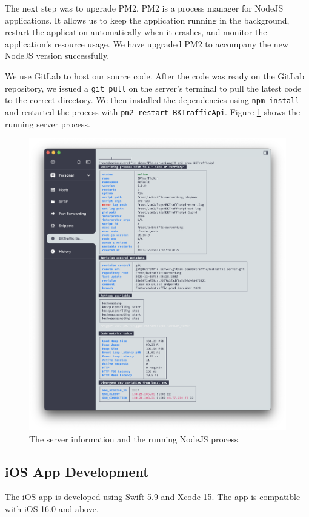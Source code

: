 The next step was to upgrade PM2. PM2 is a process manager for NodeJS applications. It allows us to keep the application running in the background, restart the application automatically when it crashes, and monitor the application's resource usage. We have upgraded PM2 to accompany the new NodeJS version successfully.

We use GitLab to host our source code. After the code was ready on the GitLab repository, we issued a \lstinline{git pull} on the server's terminal to pull the latest code to the correct directory. We then installed the dependencies using \lstinline{npm install} and restarted the process with \lstinline{pm2 restart BKTrafficApi}. Figure \ref{fig:pm2_show} shows the running server process.

\begin{figure}[H]
    \centering
    \includegraphics[width=\textwidth]{assets/images/Implementation/pm2_show.png}
    \caption{The server information and the running NodeJS process.}
    \label{fig:pm2_show}
\end{figure}

\subsection{iOS App Development}
The iOS app is developed using Swift 5.9 and Xcode 15. The app is compatible with iOS 16.0 and above.


